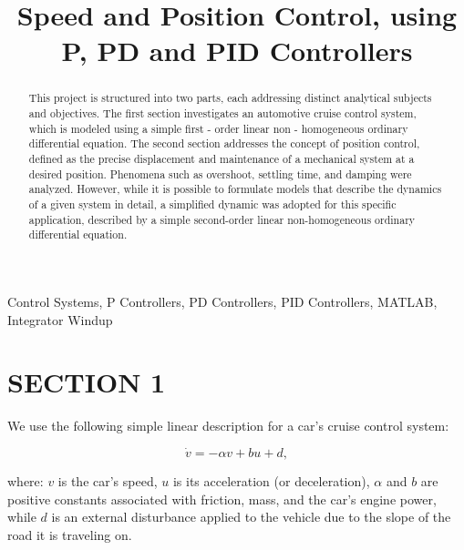 \documentclass[conference]{IEEEtran}
\begin{document}
\title{Speed and Position Control, using P, PD and PID Controllers}

\author{
}

\maketitle

\begin{abstract}
This project is structured into two parts, each addressing distinct analytical subjects and objectives. The first section investigates an automotive cruise control system, which is modeled using a simple first - order linear non - homogeneous ordinary differential equation. The second section addresses the concept of position control, defined as the precise displacement and maintenance of a mechanical system at a desired position. Phenomena such as overshoot, settling time, and damping were analyzed. However, while it is possible to formulate models that describe the dynamics of a given system in detail, a simplified dynamic was adopted for this specific application, described by a simple second-order linear non-homogeneous ordinary differential equation.
\end{abstract}

\begin{IEEEkeywords}
Control Systems, P Controllers, PD Controllers, PID Controllers, MATLAB, Integrator Windup
\end{IEEEkeywords}

\section{SECTION 1}

We use the following simple linear description for a car's cruise control system:

\begin{equation}
    \dot{v} = -\alpha v + b u + d,
\end{equation}

where: $v$ is the car's speed, $u$ is its acceleration (or deceleration), $\alpha$ and $b$ are positive constants associated with friction, mass, and the car's engine power, while $d$ is an external disturbance applied to the vehicle due to the slope of the road it is traveling on.
\end{document}
